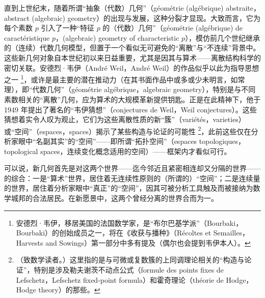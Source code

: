 直到上世纪末，随着所谓“抽象（代数）几何”（géométrie (algébrique) abstraite，abstract (algebraic) geometry）的出现与发展，这种分裂才显现。大致而言，它为每个素数 $p$ 引入了一种“特征 $p$ 的（代数）几何”（géométrie (algébrique) de caractéristique $p$，(algebraic) geometry of characteristic $p$），模仿前几个世纪继承的（连续）代数几何模型，但置于一个看似无可避免的“离散”与“不连续”背景中。这些新几何对象自本世纪初以来日益重要，尤其是因其与算术——离散结构科学的密切关联。安德烈·韦伊（André Weil，André Weil）的作品似乎以此为指导思想之一 \footnote{安德烈·韦伊，移居美国的法国数学家，是“布尔巴基学派”（Bourbaki，Bourbaki）的创始成员之一，将在《收获与播种》（Récoltes et Semailles，Harvests and Sowings）第一部分中多有提及（偶尔也会提到韦伊本人）。}，或许是最主要的潜在推动力（在其书面作品中或多或少未明言，如常理），即“代数几何”（géométrie algébrique，algebraic geometry），特别是与不同素数相关的“离散”几何，应为算术的大规模革新提供钥匙。正是在此精神下，他于 1949 年提出了著名的“韦伊猜想”（conjectures de Weil，Weil conjectures）。这些猜想着实令人叹为观止，它们为这些离散性质的新“簇”（variétés，varieties）或“空间”（espaces，spaces）揭示了某些构造与论证的可能性 \footnote{（致数学读者。）这里指的是与可微或复数簇的上同调理论相关的“构造与论证”，特别是涉及勒夫谢茨不动点公式（formule des points fixes de Lefschetz，Lefschetz fixed-point formula）和霍奇理论（théorie de Hodge，Hodge theory）的那些。}，此前这些仅在分析家眼中“名副其实”的“空间”——即所谓“拓扑空间”（espaces topologiques，topological spaces，连续变化概念适用的空间）——框架内才看似可行。

可以说，新几何首先是对这两个世界——迄今邻近且紧密相连却又分隔的世界——的综合：一是“算术”世界，居住着无连续性原则的（所谓的）“空间”；二是连续量的世界，居住着分析家眼中“真正”的“空间”，因其可被分析工具触及而被接纳为数学城邦的合法居民。在新愿景中，这两个曾经分离的世界合而为一。

